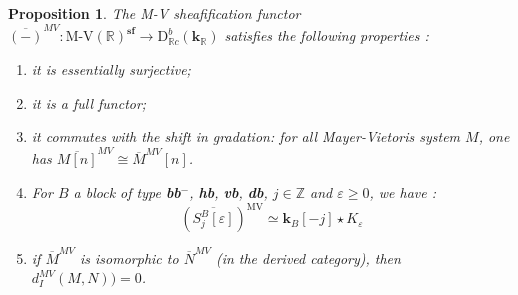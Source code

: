 \documentclass[a4paper, english, 11pt]{article}
\newcommand{\kk}[0]{\textbf{k}}
\newcommand{\0}{\vec{0}}
\newcommand{\R}[0]{\mathbb{R}}
\newcommand{\Z}[0]{\mathbb{Z}}
\newcommand{\D}[0]{\text{D}}
\newcommand{\MV}{\text{MV}}
\newcommand{\s}{\textbf{sf}}
\newtheorem{prop}{Proposition}[section]
\begin{document}
\begin{prop}\label{P:PropertiesofMVSheafification}
The M-V sheafification functor $\overline{(-)}^{MV}: \text{M-V}(\R)^{\s} \to  \D^b_{\R c}(\kk_\R)$ satisfies the following properties : 
\begin{enumerate}
    \item it is essentially surjective;
    \item it is a full functor;
    \item it commutes with the shift in gradation: for all Mayer-Vietoris system $M$, one has $\overline{M[n]}^{MV} \cong \overline{M}^{MV}[n]$. 
    \item For $B$ a block of type \textbf{bb$^-$}, \textbf{hb}, \textbf{vb}, \textbf{db}, $j\in \Z$ and $\varepsilon \geq 0$, we have : $$(\overline{S_j^B [\varepsilon]})^{\MV} \simeq \kk_B[-j] \star K_\varepsilon $$
    \item if $\overline{M}^{MV}$ is isomorphic to  $\overline{N}^{MV}$ (in the derived category), then $d_I^{MV}(M, N)) =0$.
 \end{enumerate}
\end{prop}
\end{document}
